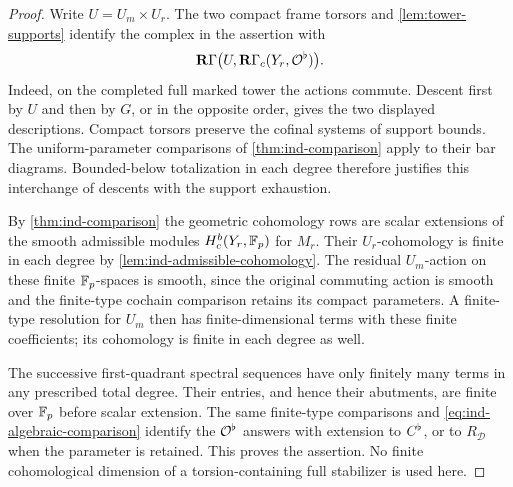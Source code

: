 
\begin{proof}
Write $U=U_m\times U_r$.  The two compact frame torsors
and \cref{lem:tower-supports} identify the complex in the
assertion with
\[
 \mathbf R\Gamma\bigl(U,\mathbf R\Gamma_c(Y_r,\mathcal O^\flat)\bigr).
\]
Indeed, on the completed full marked tower the actions
commute.  Descent first by $U$ and then by $G$, or in the
opposite order, gives the two displayed descriptions.
Compact torsors preserve the cofinal systems of support
bounds.  The uniform-parameter comparisons of
\cref{thm:ind-comparison} apply to their bar diagrams.
Bounded-below totalization in each degree therefore
justifies this interchange of descents with the support
exhaustion.

By \cref{thm:ind-comparison} the geometric cohomology rows
are scalar extensions of the smooth admissible modules
$H_c^b(Y_r,\mathbb F_p)$ for $M_r$.  Their $U_r$-cohomology is
finite in each degree by
\cref{lem:ind-admissible-cohomology}.  The residual
$U_m$-action on these finite $\mathbb F_p$-spaces is smooth, since
the original commuting action is smooth and the
finite-type cochain comparison retains its compact
parameters.  A finite-type resolution for $U_m$ then has
finite-dimensional terms with these finite coefficients;
its cohomology is finite in each degree as well.

The successive first-quadrant spectral sequences have only
finitely many terms in any prescribed total degree.
Their entries, and hence their abutments, are finite over
$\mathbb F_p$ before scalar extension.  The same finite-type
comparisons and \cref{eq:ind-algebraic-comparison} identify
the $\mathcal O^\flat$ answers with extension to $C^\flat$, or to
$R_{\mathcal D}$ when the parameter is retained.  This
proves the assertion.  No finite cohomological dimension
of a torsion-containing full stabilizer is used here.
\end{proof}

